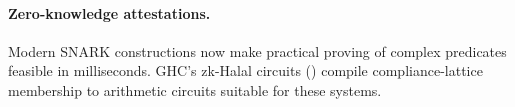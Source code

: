 \paragraph{Zero-knowledge attestations.}
Modern SNARK constructions \cite{groth16,plonk,halo2} now make
practical proving of complex predicates feasible in milliseconds. GHC's
zk-Halal circuits () compile compliance-lattice
membership to arithmetic circuits suitable for these systems.
